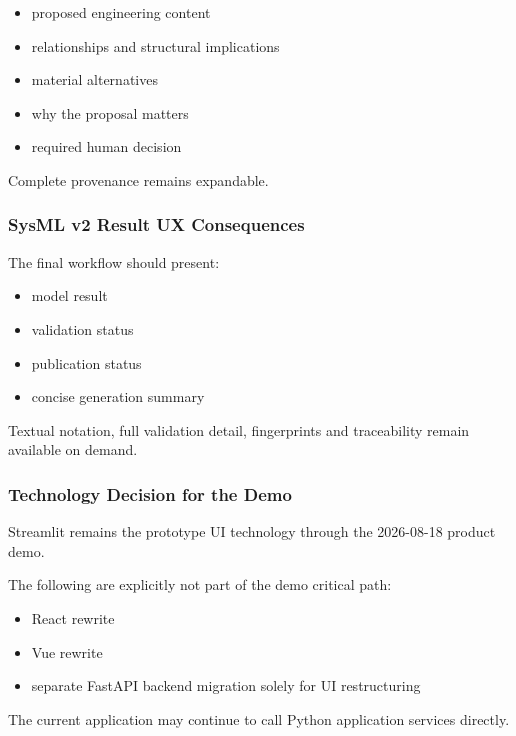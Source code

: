 \begin{itemize}
\tightlist
\item
  proposed engineering content
\item
  relationships and structural implications
\item
  material alternatives
\item
  why the proposal matters
\item
  required human decision
\end{itemize}

Complete provenance remains expandable.

\hypertarget{sysml-v2-result-ux-consequences}{%
\subsubsection{SysML v2 Result UX Consequences}\label{sysml-v2-result-ux-consequences}}

The final workflow should present:

\begin{itemize}
\tightlist
\item
  model result
\item
  validation status
\item
  publication status
\item
  concise generation summary
\end{itemize}

Textual notation, full validation detail, fingerprints and traceability remain available on demand.

\hypertarget{technology-decision-for-the-demo}{%
\subsubsection{Technology Decision for the Demo}\label{technology-decision-for-the-demo}}

Streamlit remains the prototype UI technology through the 2026-08-18 product demo.

The following are explicitly not part of the demo critical path:

\begin{itemize}
\tightlist
\item
  React rewrite
\item
  Vue rewrite
\item
  separate FastAPI backend migration solely for UI restructuring
\end{itemize}

The current application may continue to call Python application services directly.

